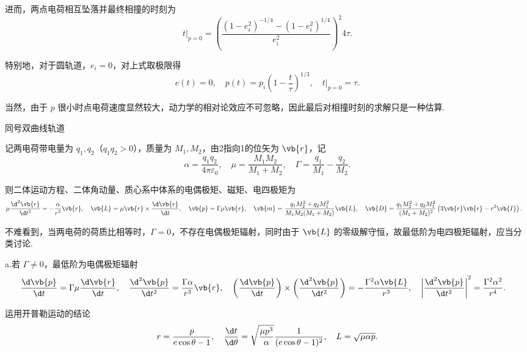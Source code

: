\begin{example}
	进而，两点电荷相互坠落并最终相撞的时刻为
	\begin{equation*}
		t\big|_{p=0} = \left(\frac{(1 - e_i^2)^{-1/4} - (1 - e_i^2)^{1/4}}{e_i^2}\right)^2 4\tau.
	\end{equation*}

	特别地，对于圆轨道，\(e_i = 0\)，对上式取极限得
	\begin{equation*}
		e(t) = 0, \quad p(t) = p_i \left(1 - \frac{t}{\tau}\right)^{1/3}, \quad t\big|_{p=0} = \tau.
	\end{equation*}

	当然，由于 \(p\) 很小时点电荷速度显然较大，动力学的相对论效应不可忽略，因此最后对相撞时刻的求解只是一种估算.
\end{example}

\begin{example}
	同号双曲线轨道

	记两电荷带电量为 \(q_1, q_2\)（\(q_1 q_2 > 0\)），质量为 \(M_1, M_2\)，由2指向1的位矢为 \(\vb{r}\)，记
	\begin{equation*}
		\alpha = \frac{q_1 q_2}{4\pi\varepsilon_0}, \quad \mu = \frac{M_1 M_2}{M_1 + M_2}, \quad \Gamma = \frac{q_1}{M_1} - \frac{q_2}{M_2}.
	\end{equation*}

	则二体运动方程、二体角动量、质心系中体系的电偶极矩、磁矩、电四极矩为
	\begin{align*}
		\mu \frac{\d^2\vb{r}}{\d t^2} &= -\frac{\alpha}{r^3}\vb{r}, \quad \vb{L} = \mu \vb{r} \times \frac{\d \vb{r}}{\d t}, \quad \vb{p} = \Gamma \mu \vb{r}, \quad
		\vb{m} = \frac{q_1 M_2^2 + q_2 M_1^2}{M_1 M_2 (M_1 + M_2)} \vb{L}, \quad \vb{D} = \frac{q_1 M_2^2 + q_2 M_1^2}{(M_1 + M_2)^2} \left(3\vb{r}\vb{r} - r^2 \vb{I}\right).
	\end{align*}

	不难看到，当两电荷的荷质比相等时，\(\Gamma = 0\)，不存在电偶极矩辐射，同时由于 \(\vb{L}\) 的零级解守恒，故最低阶为电四极矩辐射，应当分类讨论.


	a.若 \(\Gamma \neq 0\)，最低阶为电偶极矩辐射
	\begin{align*}
		\frac{\d \vb{p}}{\d t} &= \Gamma \mu \frac{\d \vb{r}}{\d t}, \quad \frac{\d^2\vb{p}}{\d t^2} = \frac{\Gamma \alpha}{r^3}\vb{r}, \quad
		\left(\frac{\d \vb{p}}{\d t}\right) \times \left(\frac{\d^2\vb{p}}{\d t^2}\right) = -\frac{\Gamma^2 \alpha \vb{L}}{r^3}, \quad \left| \frac{\d^2\vb{p}}{\d t^2} \right|^2 = \frac{\Gamma^2 \alpha^2}{r^4}.
	\end{align*}

	运用开普勒运动的结论
	\begin{equation*}
		r = \frac{p}{e\cos\theta - 1}, \quad \frac{\d t}{\d \theta} = \sqrt{\frac{\mu p^3}{\alpha}} \frac{1}{(e\cos\theta - 1)^2}, \quad L = \sqrt{\mu\alpha p}.
	\end{equation*}


\end{example}
